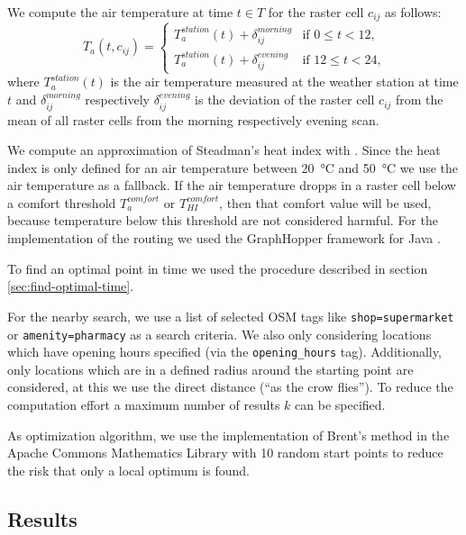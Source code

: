 We compute the air temperature at time $t\in T$ for the raster cell $c_{ij}$ as follows:
\begin{equation}
\label{eq:derived-temperature}
T_a(t, c_{ij}) = \begin{cases}
T_{a}^{station}(t) + \delta_{ij}^{morning} & \text{if $0 \leq t < 12$,}\\
T_{a}^{station}(t) + \delta_{ij}^{evening} & \text{if $12 \leq t < 24$,}
\end{cases}
\end{equation}
where $T_{a}^{station}(t)$ is the air temperature measured at the weather station at time $t$ and $\delta^{morning}_{ij}$ respectively  $\delta^{evening}_{ij}$ is the deviation of the raster cell $c_{ij}$ from the mean of all raster cells from the morning respectively evening scan.

We compute an approximation of Steadman's heat index with \textcite[77]{Stull2011}. Since the heat index is only defined for an air temperature between \SI{20}{\celsius} and \SI{50}{\celsius} we use the air temperature as a fallback. If the air temperature dropps in a raster cell below a comfort threshold $T_a^{comfort}$ or $T_{HI}^{comfort}$, then that comfort value will be used, because temperature below this threshold are not considered harmful. 
For the implementation of the routing we used the GraphHopper framework for Java \parencite{GraphHopper2016}.


To find an optimal point in time we used the procedure described in section \ref{sec:find-optimal-time}. 

For the nearby search, we  use a list of selected OSM tags like \verb|shop=supermarket| or \verb|amenity=pharmacy| as a search criteria. We also only considering locations which have opening hours specified (via the \verb|opening_hours| tag). Additionally, only locations which are in a defined radius around the starting point are considered, at this we use the direct distance (“as the crow flies”). To reduce the computation effort a maximum number of results $k$ can be specified.

As optimization algorithm, we use the implementation of Brent's method in the Apache Commons Mathematics Library \parencite{ASF2016} with 10 random start points to reduce the risk that only a local optimum is found.

\subsection{Results}

